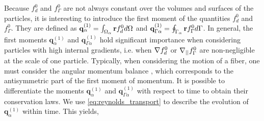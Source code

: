 Because $f_d^0$ and $f_\Gamma^0$ are not always constant over the volumes and surfaces of the particles, it is interesting to introduce the first moment of the quantities $f_d^0$ and $f_\Gamma^0$. 
They are defined as $\textbf{q}_\alpha^{(1)}     = \int_{\Omega_{\alpha}}  \textbf{r} f_d^0  d\Omega$ and $\textbf{q}_{\Gamma\alpha}^{(1)}    = \oint_{\Gamma_{\alpha}}  \textbf{r} f_\Gamma^0  d\Gamma$.  
In general, the first moments $\textbf{q}^{(1)}_{\alpha}$ and $\textbf{q}^{(1)}_{\Gamma\alpha}$ hold significant importance when considering particles with high internal gradients, i.e. when $\mathbf{\nabla} f_d^0$ or $\mathbf{\nabla}_{||} f_\Gamma^0$ are non-negligible at the scale of one particle. 
Typically, when considering the motion of a fiber, one must consider the angular momentum balance \citep{guazzelli2011}, which corresponds to the antisymmetric part of the first moment of momentum.
It is possible to differentiate the moments $\textbf{q}^{(1)}_\alpha$ and $\textbf{q}^{(1)}_{\Gamma\alpha}$  with respect to time to obtain their conservation laws.
We use \ref{eq:reynolds_transport} to describe the evolution of $\textbf{q}^{(1)}_\alpha$ within time. This yields, 
